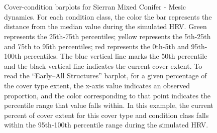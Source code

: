 \begin{figure}[!htbp]
  \\%
  \\%
    \\%
    \\%
    \\%
    \\%
    \\%
  \caption{Cover-condition barplots for Sierran Mixed Conifer - Mesic dynamics. For each condition class, the color the bar represents the distance from the median value during the simulated HRV. Green represents the 25th-75th percentiles; yellow represents the 5th-25th and 75th to 95th percentiles; red represents the 0th-5th and 95th-100th percentiles. The blue vertical line marks the 50th percentile and the black vertical line indicates the current cover extent. To read the ``Early–All Structures'' barplot, for a given percentage of the cover type extent, the x-axis value indicates an observed proportion, and the color corresponding to that point indicates the percentile range that value falls within. In this example, the current percent of cover extent for this cover type and condition class falls within the 95th-100th percentile range during the simulated HRV.}
  \label{fig:covcondbar_smcm}
\end{figure}

